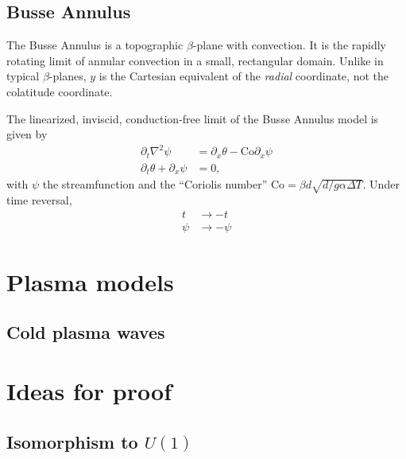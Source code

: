 \documentclass[11pt]{article}
\begin{document}
\subsection{Busse Annulus}
\label{sec:busse}

The Busse Annulus is a topographic $\beta$-plane with convection.
It is the rapidly rotating limit of annular convection in a small, rectangular domain.
Unlike in typical $\beta$-planes, $y$ is the Cartesian equivalent of the \emph{radial} coordinate, not the colatitude coordinate.

The linearized, inviscid, conduction-free limit of the Busse Annulus model is given by
\begin{align}
  \partial_t \nabla^2 \psi &= \partial_x \theta - \mathrm{Co} \partial_x \psi\\
  \partial_t \theta + \partial_x \psi &= 0,
\end{align}
with $\psi$ the streamfunction and the ``Coriolis number'' $\mathrm{Co} = \beta d \sqrt{d/g\alpha \Delta T}$.
Under time reversal,
\begin{align}
  t &\to -t\\
  \psi &\to -\psi
\end{align}
\section{Plasma models}
\label{sec:plasmas}

\subsection{Cold plasma waves}
\label{sec:cold_plasma}



\section{Ideas for proof}
\label{sec:proof_ideas}

\subsection{Isomorphism to $U(1)$}
\label{sec:u1_iso}
\end{document}
